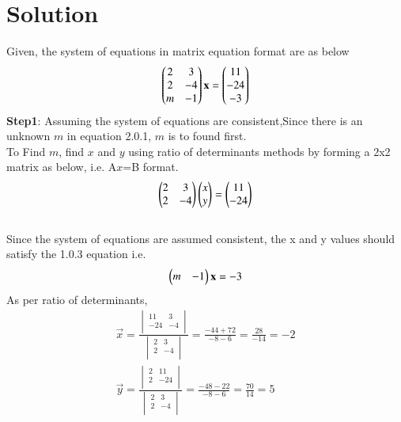 \documentclass[journal,12pt,twocolumn]{IEEEtran}
\begin{document}
\section{Solution}
Given, the system of equations in matrix equation format are as below
\begin{align}
\begin{pmatrix}2 & 3\\2 & -4\\m & -1\end{pmatrix}
\mathbf{x}=
\begin{pmatrix}11\\-24\\-3\end{pmatrix}
\end{align}
\textbf{Step1}: Assuming the system of equations are consistent,Since there is an unknown $m$ in equation 2.0.1, $m$ is to found first. 
\\To Find $m$, find $x$ and $y$ using ratio of determinants methods by forming a 2x2 matrix as below, i.e. A$x$=B format.\\
\begin{align}
\begin{pmatrix}2 & 3\\2 & -4\end{pmatrix}
\begin{pmatrix}x\\y\end{pmatrix}=
\begin{pmatrix}11\\-24\end{pmatrix}
\end{align}
\\Since the system of equations are assumed consistent, the x and y values should satisfy the 1.0.3 equation i.e.
\begin{align*}
\begin{pmatrix}m & -1\end{pmatrix}\mathbf{x}&=-3\\
\end{align*}
As per ratio of determinants,\\
\begin{align*}
\vec{x}=\frac{\begin{vmatrix}11 & 3\\-24 & -4\\\end{vmatrix}}{\begin{vmatrix}2 & 3\\2 & -4\\\end{vmatrix}}=\frac{-44+72}{-8-6}=\frac{28}{-14}=-2\\
\vec{y}=\frac{\begin{vmatrix}2 & 11\\2 & -24\\\end{vmatrix}}{\begin{vmatrix}2 & 3\\2 & -4\\\end{vmatrix}}=\frac{-48-22}{-8-6}=\frac{70}{14}=5\\
\end{align*}
\end{document}
